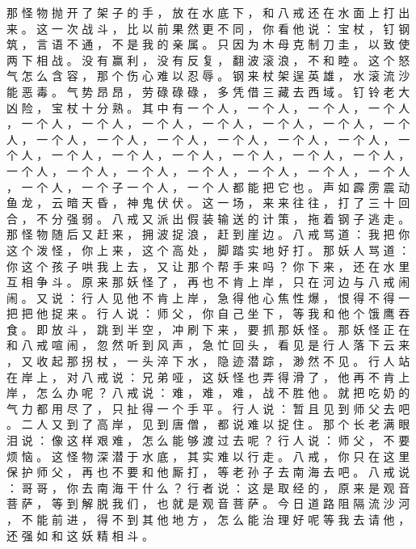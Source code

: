 {那 怪 物 抛 开 了 架 子 的 手 ， 放 在 水 底 下 ， 和 八 戒 还 在 水 面 上 打 出 来 。
这 一 次 战 斗 ， 比 以 前 果 然 更 不 同 ， 你 看 他 说 ： 宝 杖 ， 钉 钢 筑 ， 言 语 不 通 ， 不 是 我 的 亲 属 。
只 因 为 木 母 克 制 刀 圭 ， 以 致 使 两 下 相 战 。
没 有 赢 利 ， 没 有 反 复 ， 翻 波 滚 浪 ， 不 和 睦 。
这 个 怒 气 怎 么 含 容 ， 那 个 伤 心 难 以 忍 辱 。
钢 来 杖 架 逞 英 雄 ， 水 滚 流 沙 能 恶 毒 。
气 势 昂 昂 ， 劳 碌 碌 碌 ， 多 凭 借 三 藏 去 西 域 。
钉 铃 老 大 凶 险 ， 宝 杖 十 分 熟 。
其 中 有 一 个 人 ， 一 个 人 ， 一 个 人 ， 一 个 人 ， 一 个 人 ， 一 个 人 ， 一 个 人 ， 一 个 人 ， 一 个 人 ， 一 个 人 ， 一 个 人 ， 一 个 人 ， 一 个 人 ， 一 个 人 ， 一 个 人 ， 一 个 人 ， 一 个 人 ， 一 个 人 ， 一 个 人 ， 一 个 人 ， 一 个 人 ， 一 个 人 ， 一 个 人 ， 一 个 人 ， 一 个 人 ， 一 个 人 ， 一 个 人 ， 一 个 人 ， 一 个 人 ， 一 个 人 ， 一 个 人 ， 一 个 人 ， 一 个 子 一 个 人 ， 一 个 人 都 能 把 它 也 。
声 如 霹 雳 震 动 鱼 龙 ， 云 暗 天 昏 ， 神 鬼 伏 伏 。
这 一 场 ， 来 来 往 往 ， 打 了 三 十 回 合 ， 不 分 强 弱 。
八 戒 又 派 出 假 装 输 送 的 计 策 ， 拖 着 钢 子 逃 走 。
那 怪 物 随 后 又 赶 来 ， 拥 波 捉 浪 ， 赶 到 崖 边 。
八 戒 骂 道 ： 我 把 你 这 个 泼 怪 ， 你 上 来 ， 这 个 高 处 ， 脚 踏 实 地 好 打 。
那 妖 人 骂 道 ： 你 这 个 孩 子 哄 我 上 去 ， 又 让 那 个 帮 手 来 吗 ？
你 下 来 ， 还 在 水 里 互 相 争 斗 。
原 来 那 妖 怪 了 ， 再 也 不 肯 上 岸 ， 只 在 河 边 与 八 戒 闹 闹 。
又 说 ： 行 人 见 他 不 肯 上 岸 ， 急 得 他 心 焦 性 爆 ， 恨 得 不 得 一 把 把 他 捉 来 。
行 人 说 ： 师 父 ， 你 自 己 坐 下 ， 等 我 和 他 个 饿 鹰 吞 食 。
即 放 斗 ， 跳 到 半 空 ， 冲 刷 下 来 ， 要 抓 那 妖 怪 。
那 妖 怪 正 在 和 八 戒 喧 闹 ， 忽 然 听 到 风 声 ， 急 忙 回 头 ， 看 见 是 行 人 落 下 云 来 ， 又 收 起 那 拐 杖 ， 一 头 淬 下 水 ， 隐 迹 潜 踪 ， 渺 然 不 见 。
行 人 站 在 岸 上 ， 对 八 戒 说 ： 兄 弟 哑 ， 这 妖 怪 也 弄 得 滑 了 ， 他 再 不 肯 上 岸 ， 怎 么 办 呢 ？ 八 戒 说 ： 难 ， 难 ， 难 ， 战 不 胜 他 。
就 把 吃 奶 的 气 力 都 用 尽 了 ， 只 扯 得 一 个 手 平 。
行 人 说 ： 暂 且 见 到 师 父 去 吧 。
二 人 又 到 了 高 岸 ， 见 到 唐 僧 ， 都 说 难 以 捉 住 。
那 个 长 老 满 眼 泪 说 ： 像 这 样 艰 难 ， 怎 么 能 够 渡 过 去 呢 ？ 行 人 说 ： 师 父 ， 不 要 烦 恼 。
这 怪 物 深 潜 于 水 底 ， 其 实 难 以 行 走 。
八 戒 ， 你 只 在 这 里 保 护 师 父 ， 再 也 不 要 和 他 厮 打 ， 等 老 孙 子 去 南 海 去 吧 。
八 戒 说 ： 哥 哥 ， 你 去 南 海 干 什 么 ？ 行 者 说 ： 这 是 取 经 的 ， 原 来 是 观 音 菩 萨 ， 等 到 解 脱 我 们 ， 也 就 是 观 音 菩 萨 。
今 日 道 路 阻 隔 流 沙 河 ， 不 能 前 进 ， 得 不 到 其 他 地 方 ， 怎 么 能 治 理 好 呢 等 我 去 请 他 ， 还 强 如 和 这 妖 精 相 斗 。
}
